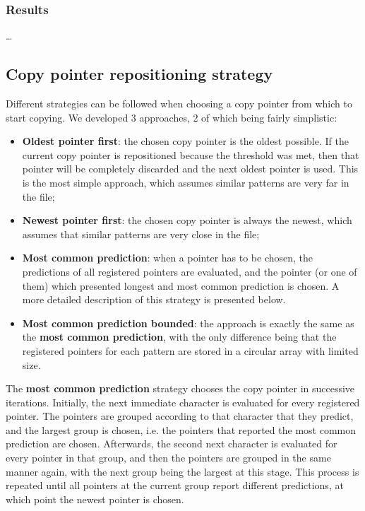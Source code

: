 \documentclass{article}
\begin{document}
\subsubsection{Results}

\dots

\subsection{Copy pointer repositioning strategy}

Different strategies can be followed when choosing a copy pointer from which to start copying.
We developed 3 approaches, 2 of which being fairly simplistic:
\begin{itemize}
    \item \textbf{Oldest pointer first}: the chosen copy pointer is the oldest possible. If the current copy pointer is repositioned because the threshold was met, then that pointer will be completely discarded and the next oldest pointer is used.
    This is the most simple approach, which assumes similar patterns are very far in the file;
    \item \textbf{Newest pointer first}: the chosen copy pointer is always the newest, which assumes that similar patterns are very close in the file;
    \item \textbf{Most common prediction}: when a pointer has to be chosen, the predictions of all registered pointers are evaluated, and the pointer (or one of them) which presented longest and most common prediction is chosen.
    A more detailed description of this strategy is presented below.
    \item \textbf{Most common prediction bounded}: the approach is exactly the same as the \textbf{most common prediction}, with the only difference being that the registered pointers for each pattern are stored in a circular array with limited size.
\end{itemize}

The \textbf{most common prediction} strategy chooses the copy pointer in successive iterations.
Initially, the next immediate character is evaluated for every registered pointer.
The pointers are grouped according to that character that they predict, and the largest group is chosen, i.e. the pointers that reported the most common prediction are chosen.
Afterwards, the second next character is evaluated for every pointer in that group, and then the pointers are grouped in the same manner again, with the next group being the largest at this stage.
This process is repeated until all pointers at the current group report different predictions, at which point the newest pointer is chosen.
\end{document}
